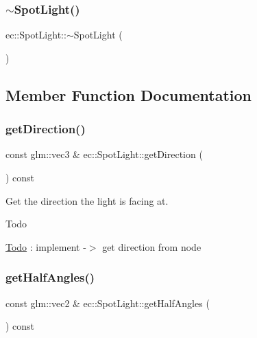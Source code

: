 \mbox{\label{classec_1_1_spot_light_adc9a1ffa198252e085c6862c063c8263}} 
\subsubsection{\texorpdfstring{$\sim$\+Spot\+Light()}{~SpotLight()}}
{\footnotesize\ttfamily ec\+::\+Spot\+Light\+::$\sim$\+Spot\+Light (\begin{DoxyParamCaption}{ }\end{DoxyParamCaption})\hspace{0.3cm}{\ttfamily [default]}}



\subsection{Member Function Documentation}
\mbox{\label{classec_1_1_spot_light_a373e8b5dc16c19fb7a0ba8ea5333f551}} 
\subsubsection{\texorpdfstring{get\+Direction()}{getDirection()}}
{\footnotesize\ttfamily const glm\+::vec3 \& ec\+::\+Spot\+Light\+::get\+Direction (\begin{DoxyParamCaption}{ }\end{DoxyParamCaption}) const}

Get the direction the light is facing at. \begin{DoxyRefDesc}{Todo}
\item[\mbox{\hyperlink{todo__todo000005}{Todo}}]\+: implement -\/$>$ get direction from node \end{DoxyRefDesc}
\mbox{\label{classec_1_1_spot_light_a1f53e54ee38973a55438c0321b78b439}} 
\subsubsection{\texorpdfstring{get\+Half\+Angles()}{getHalfAngles()}}
{\footnotesize\ttfamily const glm\+::vec2 \& ec\+::\+Spot\+Light\+::get\+Half\+Angles (\begin{DoxyParamCaption}{ }\end{DoxyParamCaption}) const}

